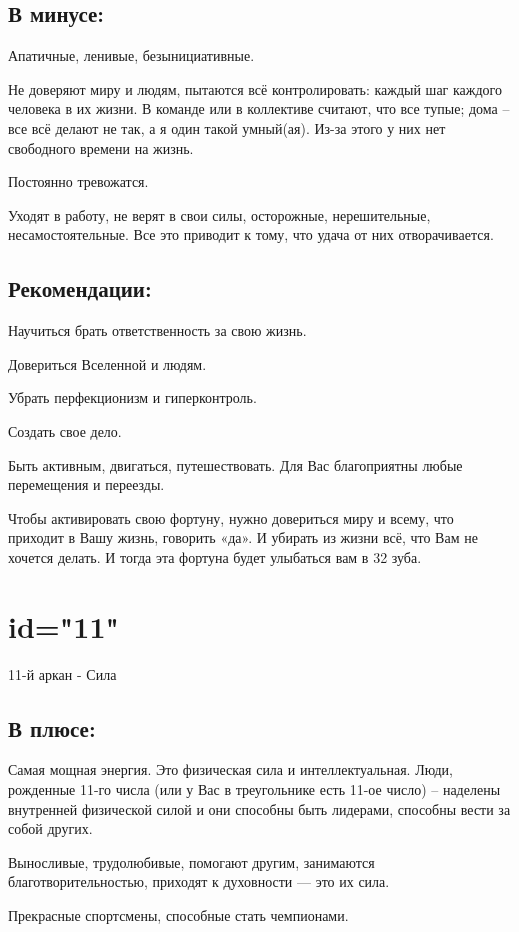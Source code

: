 \subsection{В минусе:}
\item Апатичные, ленивые, безынициативные.
\item Не доверяют миру и людям, пытаются всё контролировать: каждый шаг каждого человека в их жизни. В команде или в коллективе считают, что все тупые; дома – все всё делают не так, а я один такой умный(ая). Из-за этого у них нет свободного времени на жизнь.
\item Постоянно тревожатся.
\item Уходят в работу, не верят в свои силы, осторожные, нерешительные, несамостоятельные. Все это приводит к тому, что удача от них отворачивается.
\endsubsection

\subsection{Рекомендации:}
\item Научиться брать ответственность за свою жизнь.
\item Довериться Вселенной и людям.
\item Убрать перфекционизм и гиперконтроль.
\item Создать свое дело.
\item Быть активным, двигаться, путешествовать. Для Вас благоприятны любые перемещения и переезды.
\item Чтобы активировать свою фортуну, нужно довериться миру и всему, что приходит в Вашу жизнь, говорить «да». И убирать из жизни всё, что Вам не хочется делать. И тогда эта фортуна будет улыбаться вам в 32 зуба.
\endsubsection

\endsection

\section{id="11"}{11-й аркан - Сила}

\subsection{В плюсе:}
\item Самая мощная энергия. Это физическая сила и интеллектуальная. Люди, рожденные 11-го числа (или у Вас в треугольнике есть 11-ое число) – наделены внутренней физической силой и они способны быть лидерами, способны вести за собой других.
\item Выносливые, трудолюбивые, помогают другим, занимаются благотворительностью, приходят к духовности — это их сила.
\item Прекрасные спортсмены, способные стать чемпионами.
\endsubsection

